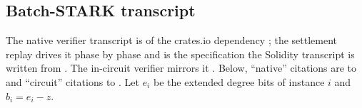 \subsection{Batch-STARK transcript}
\label{subsec:ps-transcript}

The native verifier transcript is  of the
crates.io dependency  ; the
settlement replay drives it phase by phase and is the specification the Solidity
transcript is written from .
The in-circuit verifier  mirrors it
. Below,
``native'' citations are to  and
``circuit'' citations to . Let $e_i$ be the extended degree
bits of instance $i$ and $b_i = e_i - z$.

